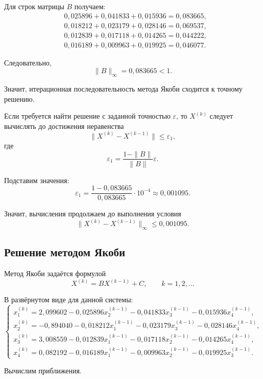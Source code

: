 Для строк матрицы $B$ получаем:
\[
\begin{aligned}
&0{,}025896+0{,}041833+0{,}015936=0{,}083665,\\
&0{,}018212+0{,}023179+0{,}028146=0{,}069537,\\
&0{,}012839+0{,}017118+0{,}014265=0{,}044222,\\
&0{,}016189+0{,}009963+0{,}019925=0{,}046077.
\end{aligned}
\]

Следовательно,
\[
\|B\|_{\infty}=0{,}083665<1.
\]

Значит, итерационная последовательность метода Якоби сходится к точному решению.

Если требуется найти решение с заданной точностью $\varepsilon$, то $X^{(k)}$ следует вычислять до достижения неравенства
\[
\|X^{(k)}-X^{(k-1)}\|\leq\varepsilon_1,
\]
где
\[
\varepsilon_1=
\frac{1-\|B\|}{\|B\|}\varepsilon.
\]

Подставим значения:
\[
\varepsilon_1=
\frac{1-0{,}083665}{0{,}083665}\cdot10^{-4}
\approx0{,}001095.
\]

Значит, вычисления продолжаем до выполнения условия
\[
\|X^{(k)}-X^{(k-1)}\|_{\infty}\leq0{,}001095.
\]

\subsection{Решение методом Якоби}

Метод Якоби задаётся формулой
\[
X^{(k)}=BX^{(k-1)}+C,
\qquad k=1,2,\ldots
\]

В развёрнутом виде для данной системы:
\[
\begin{cases}
x_1^{(k)}=2{,}099602-0{,}025896x_2^{(k-1)}-0{,}041833x_3^{(k-1)}-0{,}015936x_4^{(k-1)},\\
x_2^{(k)}=-0{,}894040-0{,}018212x_1^{(k-1)}-0{,}023179x_3^{(k-1)}-0{,}028146x_4^{(k-1)},\\
x_3^{(k)}=3{,}008559-0{,}012839x_1^{(k-1)}-0{,}017118x_2^{(k-1)}-0{,}014265x_4^{(k-1)},\\
x_4^{(k)}=0{,}082192-0{,}016189x_1^{(k-1)}-0{,}009963x_2^{(k-1)}-0{,}019925x_3^{(k-1)}.
\end{cases}
\]

Вычислим приближения.

